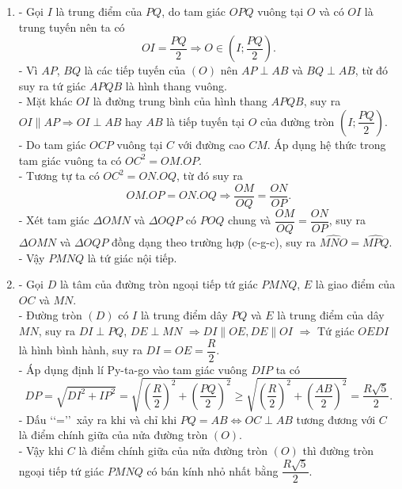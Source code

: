 \begin{ex}
{\begin{enumerate}
{
        }      
        \item - Gọi $I$ là trung điểm của $PQ$, do tam giác $OPQ$ vuông tại $O$ và có $OI$ là trung tuyến nên ta có 
        $$OI=\dfrac{PQ}{2}\Rightarrow O\in \left(I;\dfrac{PQ}{2}\right).$$
        - Vì $AP$, $BQ$ là các tiếp tuyến của $(O)$ nên $AP\perp AB$ và $BQ\perp AB$, từ đó suy ra tứ giác $APQB$ là hình thang vuông.\\
        - Mặt khác $OI$ là đường trung bình của hình thang $APQB$, suy ra $OI\parallel AP\Rightarrow OI\perp AB$ hay $AB$ là tiếp tuyến tại $O$ của đường tròn $\left(I;\dfrac{PQ}{2}\right)$.\\
        - Do tam giác $OCP$ vuông tại $C$ với đường cao $CM$. Áp dụng hệ thức trong tam giác vuông ta có $OC^2=OM.OP$.\\
        - Tương tự ta có $OC^2=ON.OQ$, từ đó suy ra 
        $$OM.OP=ON.OQ\Rightarrow \dfrac{OM}{OQ}=\dfrac{ON}{OP}.$$
        - Xét tam giác $\Delta OMN$ và $\Delta OQP$ có $\widehat{POQ}$ chung và $\dfrac{OM}{OQ}=\dfrac{ON}{OP}$, suy ra $\Delta OMN$ và $\Delta OQP$ đồng dạng theo trường hợp (c-g-c), suy ra $\widehat{MNO}=\widehat{MPQ}$.\\
        - Vậy $PMNQ$ là tứ giác nội tiếp.
        \item - Gọi $D$ là tâm của đường tròn ngoại tiếp tứ giác $PMNQ$, $E$ là giao điểm của $OC$ và $MN$.\\
        - Đường tròn $(D)$ có $I$ là trung điểm dây $PQ$ và $E$ là trung điểm của dây $MN$, suy ra $DI\perp PQ$, $DE\perp MN$ $\Rightarrow DI\parallel OE, DE\parallel OI$ $\Rightarrow $ Tứ giác $OEDI$ là hình bình hành, suy ra $DI=OE=\dfrac{R}{2}$.\\
        - Áp dụng định lí Py-ta-go vào tam giác vuông $DIP$ ta có
        $$DP=\sqrt{DI^2+IP^2}=\sqrt{\left(\dfrac{R}{2}\right)^2+\left(\dfrac{PQ}{2}\right)^2}\ge\sqrt{\left(\dfrac{R}{2}\right)^2+\left(\dfrac{AB}{2}\right)^2}=\dfrac{R\sqrt{5}}{2}.$$
        - Dấu \lq\lq =\rq\rq \ xảy ra khi và chỉ khi $PQ=AB\Leftrightarrow OC\perp AB$ tương đương với $C$ là điểm chính giữa của nửa đường tròn $(O)$.\\
        - Vậy khi $C$ là điểm chính giữa của nửa đường tròn $(O)$ thì đường tròn ngoại tiếp tứ giác $PMNQ$ có bán kính nhỏ nhất bằng $\dfrac{R\sqrt{5}}{2}$.
        
    \end{enumerate}
    }
\end{ex}

